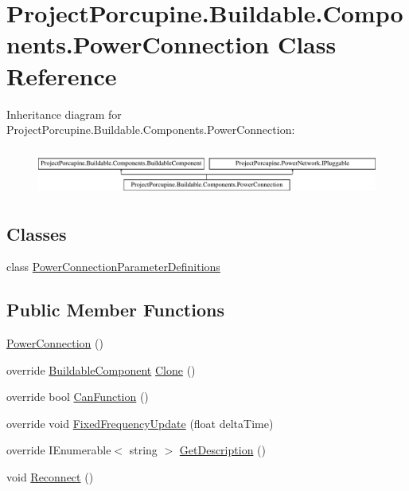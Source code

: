 \hypertarget{class_project_porcupine_1_1_buildable_1_1_components_1_1_power_connection}{}\section{Project\+Porcupine.\+Buildable.\+Components.\+Power\+Connection Class Reference}
\label{class_project_porcupine_1_1_buildable_1_1_components_1_1_power_connection}
Inheritance diagram for Project\+Porcupine.\+Buildable.\+Components.\+Power\+Connection\+:\begin{figure}[H]
\begin{center}
\leavevmode
\includegraphics[height=1.530055cm]{class_project_porcupine_1_1_buildable_1_1_components_1_1_power_connection}
\end{center}
\end{figure}
\subsection*{Classes}
\begin{DoxyCompactItemize}
\item 
class \hyperlink{class_project_porcupine_1_1_buildable_1_1_components_1_1_power_connection_1_1_power_connection_parameter_definitions}{Power\+Connection\+Parameter\+Definitions}
\end{DoxyCompactItemize}
\subsection*{Public Member Functions}
\begin{DoxyCompactItemize}
\item 
\hyperlink{class_project_porcupine_1_1_buildable_1_1_components_1_1_power_connection_ae727434973fd543484fb71b8bceca5e1}{Power\+Connection} ()
\item 
override \hyperlink{class_project_porcupine_1_1_buildable_1_1_components_1_1_buildable_component}{Buildable\+Component} \hyperlink{class_project_porcupine_1_1_buildable_1_1_components_1_1_power_connection_a8ce41c07a574080c54f2b45e7ce7279d}{Clone} ()
\item 
override bool \hyperlink{class_project_porcupine_1_1_buildable_1_1_components_1_1_power_connection_ae0c98f5109191531858d433295a99841}{Can\+Function} ()
\item 
override void \hyperlink{class_project_porcupine_1_1_buildable_1_1_components_1_1_power_connection_a1e7dcf30f17d4169978a2bf31a31b50c}{Fixed\+Frequency\+Update} (float delta\+Time)
\item 
override I\+Enumerable$<$ string $>$ \hyperlink{class_project_porcupine_1_1_buildable_1_1_components_1_1_power_connection_a65a8b6edcd5f5ece2c1b8dc78e735597}{Get\+Description} ()
\item 
void \hyperlink{class_project_porcupine_1_1_buildable_1_1_components_1_1_power_connection_af47c0e03299fbbbd9e95faf63d2a1f32}{Reconnect} ()
\end{DoxyCompactItemize}
